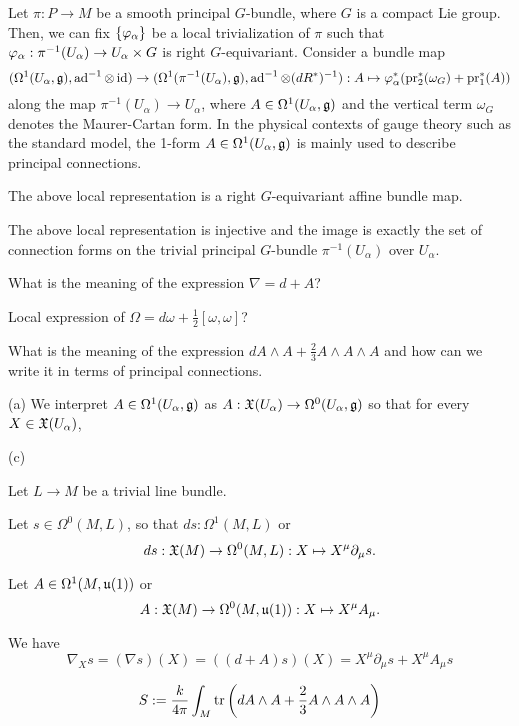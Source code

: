 \documentclass{../../large}
\begin{document}
\begin{prb}
Let $\pi:P\to M$ be a smooth principal $G$-bundle, where $G$ is a compact Lie group.
Then, we can fix $\{\varphi_\alpha\}$ be a local trivialization of $\pi$ such that $\varphi_\alpha:\pi^{-1}(U_\alpha)\to U_\alpha\times G$ is right $G$-equivariant.
Consider a bundle map
\[(\Omega^1(U_\alpha,\mathfrak{g}),\operatorname{ad}^{-1}\otimes\operatorname{id})\to(\Omega^1(\pi^{-1}(U_\alpha),\mathfrak{g}),\operatorname{ad}^{-1}\otimes(dR^*)^{-1}):A\mapsto\varphi_\alpha^*(\operatorname{pr}_2^*(\omega_G)+\operatorname{pr}_1^*(A))\]
along the map $\pi^{-1}(U_\alpha)\to U_\alpha$, where $A\in\Omega^1(U_\alpha,\mathfrak{g})$ and the vertical term $\omega_G$ denotes the Maurer-Cartan form.
In the physical contexts of gauge theory such as the standard model, the 1-form $A\in\Omega^1(U_\alpha,\mathfrak{g})$ is mainly used to describe principal connections.
\begin{parts}
\item The above local representation is a right $G$-equivariant affine bundle map.
\item The above local representation is injective and the image is exactly the set of connection forms on the trivial principal $G$-bundle $\pi^{-1}(U_\alpha)$ over $U_\alpha$.
\item What is the meaning of the expression $\nabla=d+A$?
\item Local expression of $\Omega=d\omega+\frac12[\omega,\omega]$?
\item What is the meaning of the expression $dA\wedge A+\frac23A\wedge A\wedge A$ and how can we write it in terms of principal connections.
\end{parts}
\end{prb}
\begin{pf}
(a)
We interpret $A\in\Omega^1(U_\alpha,\mathfrak{g})$ as $A:\mathfrak{X}(U_\alpha)\to\Omega^0(U_\alpha,\mathfrak{g})$ so that for every $X\in\mathfrak{X}(U_\alpha)$,
\[\]

(c)

Let $L\to M$ be a trivial line bundle.

Let $s\in\Omega^0(M,L)$, so that $ds:\Omega^1(M,L)$ or
\[ds:\mathfrak{X}(M)\to\Omega^0(M,L):X\mapsto X^\mu\partial_\mu s.\]

Let $A\in\Omega^1(M,\mathfrak{u}(1))$ or
\[A:\mathfrak{X}(M)\to\Omega^0(M,\mathfrak{u}(1)):X\mapsto X^\mu A_\mu.\]

We have
\[\nabla_Xs=(\nabla s)(X)=((d+A)s)(X)=X^\mu\partial_\mu s+X^\mu A_\mu s\]
\end{pf}


\[S:=\frac k{4\pi}\int_M\operatorname{tr}\left(dA\wedge A+\frac23A\wedge A\wedge A\right)\]
\end{document}
